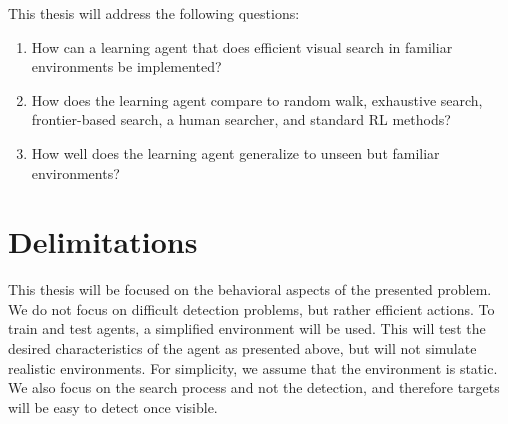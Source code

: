 This thesis will address the following questions:

\begin{enumerate}
  \item \label{itm:rq1} How can a learning agent that does efficient visual search in familiar environments be implemented?
  \item \label{itm:rq2} How does the learning agent compare to random walk, exhaustive search, frontier-based search, a human searcher, and standard RL methods?
  \item \label{itm:rq3} How well does the learning agent generalize to unseen but familiar environments?

\end{enumerate}

\section{Delimitations}
\label{sec:delimitations}


This thesis will be focused on the behavioral aspects of the presented problem.
We do not focus on difficult detection problems, but rather efficient actions.
To train and test agents, a simplified environment will be used. 
This will test the desired characteristics of the agent as presented above, but will not simulate realistic environments.
For simplicity, we assume that the environment is static. %
We also focus on the search process and not the detection, and therefore targets will be easy to detect once visible.

